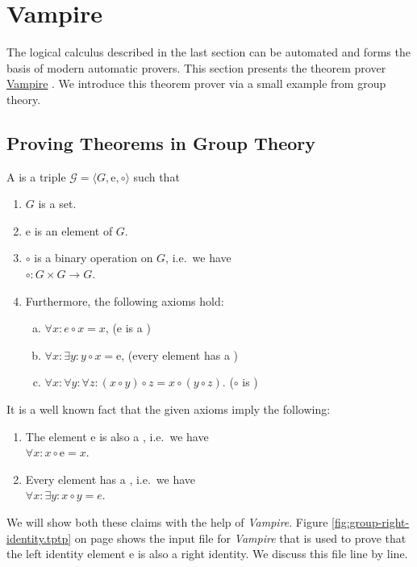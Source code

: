 \section{Vampire}
The logical calculus described in the last section can be automated and forms the basis of modern
automatic provers.  This section presents the theorem prover \href{https://vprover.github.io}{Vampire}
\cite{kovacs:2013}.  We introduce this theorem prover via a small example from group theory.

\subsection{Proving Theorems in Group Theory}
A  is a triple $\mathcal{G} = \langle G, \mathrm{e}, \circ \rangle$
such that
\begin{enumerate}
\item $G$ is a set.
\item $\mathrm{e}$ is an element of $G$.
\item $\circ$ is a binary operation on $G$, i.e.~we have
      \\[0.2cm]
      \hspace*{1.3cm}
      $\circ: G \times G \rightarrow G$.
\item Furthermore, the following axioms hold:
      \begin{enumerate}[(a)]
      \item $\forall x: e \circ x = x$, \hspace*{\fill} ($\mathrm{e}$ is a )
      \item $\forall x: \exists y: y \circ x = \mathrm{e}$, \hspace*{\fill} (every element has a ) 
      \item $\forall x: \forall y: \forall z: (x \circ y) \circ z = x \circ (y \circ z)$. \hspace*{\fill} ($\circ$ is )
      \end{enumerate}
\end{enumerate}
It is a well known fact that the given axioms imply the following:
\begin{enumerate}
\item The element $\mathrm{e}$ is also a , i.e.~we have
      \\[0.2cm]
      \hspace*{1.3cm}
      $\forall x: x \circ \mathrm{e} = x$.
\item Every element has a , i.e.~we have
      \\[0.2cm]
      \hspace*{1.3cm}
      $\forall x: \exists y: x \circ y = e$.
\end{enumerate}
We will show both these claims with the help of \textsl{Vampire}.  Figure \ref{fig:group-right-identity.tptp} on page
\pageref{fig:group-right-identity.tptp} shows the input file for \textsl{Vampire} that is used to prove that
the left identity element $\mathrm{e}$ is also a right identity.  We discuss this file line by line.

